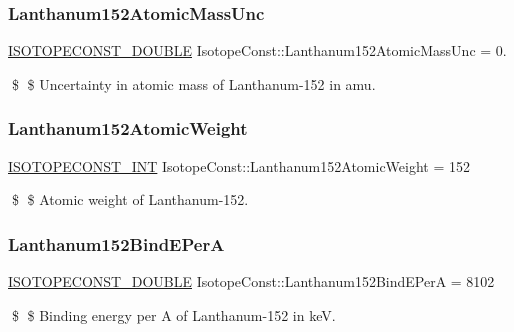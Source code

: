 \subsubsection{\texorpdfstring{Lanthanum152\+Atomic\+Mass\+Unc}{Lanthanum152AtomicMassUnc}}
{\footnotesize\ttfamily \mbox{\hyperlink{group___isotope_const-_macros_ga8f45a7272ce02c0b4c65c44636ed719a}{I\+S\+O\+T\+O\+P\+E\+C\+O\+N\+S\+T\+\_\+\+D\+O\+U\+B\+LE}} Isotope\+Const\+::\+Lanthanum152\+Atomic\+Mass\+Unc = 0.}

\$ \$ Uncertainty in atomic mass of Lanthanum-\/152 in amu. \mbox{\label{group___isotope_const-_lanthanum-_la152_gaf589cfb0a71afc30a1fce3626eeb2691}} 
\subsubsection{\texorpdfstring{Lanthanum152\+Atomic\+Weight}{Lanthanum152AtomicWeight}}
{\footnotesize\ttfamily \mbox{\hyperlink{group___isotope_const-_macros_ga5f18360b3e99483a35c32d789e62621c}{I\+S\+O\+T\+O\+P\+E\+C\+O\+N\+S\+T\+\_\+\+I\+NT}} Isotope\+Const\+::\+Lanthanum152\+Atomic\+Weight = 152}

\$ \$ Atomic weight of Lanthanum-\/152. \mbox{\label{group___isotope_const-_lanthanum-_la152_ga8a6e9db09deddd6d651b6e1429637908}} 
\subsubsection{\texorpdfstring{Lanthanum152\+Bind\+E\+PerA}{Lanthanum152BindEPerA}}
{\footnotesize\ttfamily \mbox{\hyperlink{group___isotope_const-_macros_ga8f45a7272ce02c0b4c65c44636ed719a}{I\+S\+O\+T\+O\+P\+E\+C\+O\+N\+S\+T\+\_\+\+D\+O\+U\+B\+LE}} Isotope\+Const\+::\+Lanthanum152\+Bind\+E\+PerA = 8102}

\$ \$ Binding energy per A of Lanthanum-\/152 in keV. \mbox{\label{group___isotope_const-_lanthanum-_la152_gabf149b400d2c55ab7a37b290188f5887}} 
